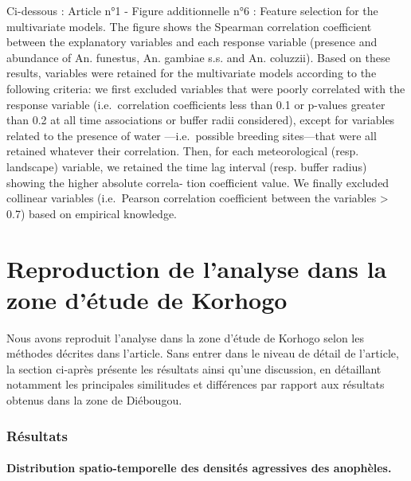 \documentclass[12pt,twoside]{reedthesis}
\begin{document}
Ci-dessous : Article n°1 - Figure additionnelle n°6 : Feature selection for the multivariate models. The figure shows the Spearman correlation coefficient between the explanatory variables and each response variable (presence and abundance of An. funestus, An. gambiae s.s. and An. coluzzii). Based on these results, variables were retained for the multivariate models according to the following criteria: we first excluded variables that were poorly correlated with the response variable (i.e.~correlation coefficients less than 0.1 or p-values greater than 0.2 at all time associations or buffer radii considered), except for variables related to the presence of water ---i.e.~possible breeding sites---that were all retained whatever their correlation. Then, for each meteorological (resp. landscape) variable, we retained the time lag interval (resp. buffer radius) showing the higher absolute correla- tion coefficient value. We finally excluded collinear variables (i.e.~Pearson correlation coefficient between the variables \textgreater{} 0.7) based on empirical knowledge.\\

\begingroup 
\renewcommand{\headrulewidth}{0pt}

\markboth{}{}


\endgroup

\hypertarget{repro-article-korhogo}{%
\section{Reproduction de l'analyse dans la zone d'étude de Korhogo}\label{repro-article-korhogo}}

Nous avons reproduit l'analyse dans la zone d'étude de Korhogo selon les méthodes décrites dans l'article. Sans entrer dans le niveau de détail de l'article, la section ci-après présente les résultats ainsi qu'une discussion, en détaillant notamment les principales similitudes et différences par rapport aux résultats obtenus dans la zone de Diébougou.

\hypertarget{ruxe9sultats}{%
\subsubsection{Résultats}\label{ruxe9sultats}}

\hypertarget{distribution-spatio-temporelle-des-densituxe9s-agressives-des-anophuxe8les.}{%
\paragraph{Distribution spatio-temporelle des densités agressives des anophèles.}\label{distribution-spatio-temporelle-des-densituxe9s-agressives-des-anophuxe8les.}}
\end{document}
